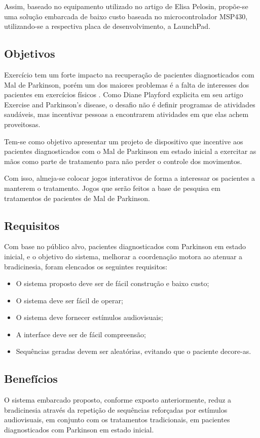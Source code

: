 \documentclass[conference]{IEEEtran}
\begin{document}
Assim, baseado no equipamento utilizado no artigo de Elisa Pelosin, propõe-se uma solução embarcada de baixo custo baseada no microcontrolador MSP430, utilizando-se a respectiva placa de desenvolvimento, a LaunchPad.




\subsection{Objetivos}
Exercício tem um forte impacto na recuperação de pacientes diagnosticados com Mal de Parkinson, porém um dos maiores problemas é a falta de interesses dos pacientes em exercícios físicos \cite{playford}. Como Diane Playford explicita em seu artigo Exercise and Parkinson’s disease, o desafio não é definir programas de atividades saudáveis, mas incentivar pessoas a encontrarem atividades em que elas achem proveitosas.

Tem-se como objetivo apresentar um projeto de dispositivo que incentive aos pacientes diagnosticados com o Mal de Parkinson em estado inicial a exercitar as mãos como parte de tratamento para não perder o controle dos movimentos.

Com isso, almeja-se colocar jogos interativos de forma a interessar os pacientes a manterem o tratamento. Jogos que serão feitos a base de pesquisa em tratamentos de pacientes de Mal de Parkinson.


\subsection{Requisitos}
Com base no público alvo, pacientes diagnosticados com Parkinson em estado inicial, e o objetivo do sistema, melhorar a coordenação motora ao atenuar a bradicinesia, foram elencados os seguintes requisitos:
\begin{itemize}[]
	\item O sistema proposto deve ser de fácil construção e baixo custo;
	\item O sistema deve ser fácil de operar;
	\item O sistema deve fornecer estímulos audiovisuais;
	\item A interface deve ser de fácil compreensão;
	\item Sequências geradas devem ser aleatórias, evitando que o paciente decore-as.
\end{itemize}



\subsection{Benefícios}
O sistema embarcado proposto, conforme exposto anteriormente, reduz a bradicinesia através da repetição de sequências reforçadas por estímulos audiovisuais, em conjunto com os tratamentos tradicionais, em pacientes diagnosticados com Parkinson em estado inicial.
\end{document}
